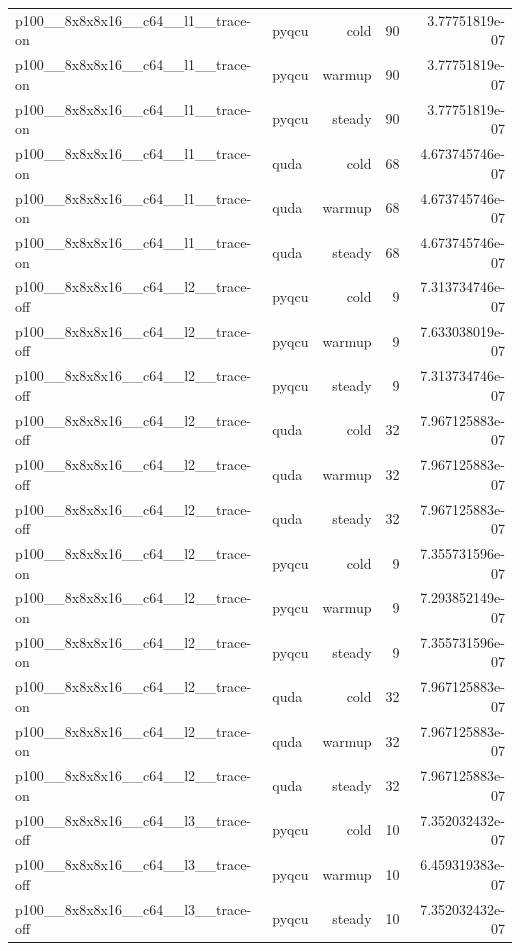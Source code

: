 \begin{table}[htbp]
\begin{tabular}{@{}llrrr@{}}
p100\_\_8x8x8x16\_\_c64\_\_l1\_\_trace-on & pyqcu & cold & 90 & 3.77751819e-07 \\
p100\_\_8x8x8x16\_\_c64\_\_l1\_\_trace-on & pyqcu & warmup & 90 & 3.77751819e-07 \\
p100\_\_8x8x8x16\_\_c64\_\_l1\_\_trace-on & pyqcu & steady & 90 & 3.77751819e-07 \\
p100\_\_8x8x8x16\_\_c64\_\_l1\_\_trace-on & quda & cold & 68 & 4.673745746e-07 \\
p100\_\_8x8x8x16\_\_c64\_\_l1\_\_trace-on & quda & warmup & 68 & 4.673745746e-07 \\
p100\_\_8x8x8x16\_\_c64\_\_l1\_\_trace-on & quda & steady & 68 & 4.673745746e-07 \\
p100\_\_8x8x8x16\_\_c64\_\_l2\_\_trace-off & pyqcu & cold & 9 & 7.313734746e-07 \\
p100\_\_8x8x8x16\_\_c64\_\_l2\_\_trace-off & pyqcu & warmup & 9 & 7.633038019e-07 \\
p100\_\_8x8x8x16\_\_c64\_\_l2\_\_trace-off & pyqcu & steady & 9 & 7.313734746e-07 \\
p100\_\_8x8x8x16\_\_c64\_\_l2\_\_trace-off & quda & cold & 32 & 7.967125883e-07 \\
p100\_\_8x8x8x16\_\_c64\_\_l2\_\_trace-off & quda & warmup & 32 & 7.967125883e-07 \\
p100\_\_8x8x8x16\_\_c64\_\_l2\_\_trace-off & quda & steady & 32 & 7.967125883e-07 \\
p100\_\_8x8x8x16\_\_c64\_\_l2\_\_trace-on & pyqcu & cold & 9 & 7.355731596e-07 \\
p100\_\_8x8x8x16\_\_c64\_\_l2\_\_trace-on & pyqcu & warmup & 9 & 7.293852149e-07 \\
p100\_\_8x8x8x16\_\_c64\_\_l2\_\_trace-on & pyqcu & steady & 9 & 7.355731596e-07 \\
p100\_\_8x8x8x16\_\_c64\_\_l2\_\_trace-on & quda & cold & 32 & 7.967125883e-07 \\
p100\_\_8x8x8x16\_\_c64\_\_l2\_\_trace-on & quda & warmup & 32 & 7.967125883e-07 \\
p100\_\_8x8x8x16\_\_c64\_\_l2\_\_trace-on & quda & steady & 32 & 7.967125883e-07 \\
p100\_\_8x8x8x16\_\_c64\_\_l3\_\_trace-off & pyqcu & cold & 10 & 7.352032432e-07 \\
p100\_\_8x8x8x16\_\_c64\_\_l3\_\_trace-off & pyqcu & warmup & 10 & 6.459319383e-07 \\
p100\_\_8x8x8x16\_\_c64\_\_l3\_\_trace-off & pyqcu & steady & 10 & 7.352032432e-07 \\

\end{tabular}
\end{table}
